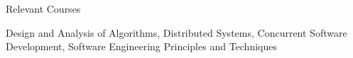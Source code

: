 \begin{rSection}{Relevant Courses}

Design and Analysis of Algorithms, Distributed Systems, Concurrent Software Development, Software Engineering Principles and Techniques

\end{rSection}